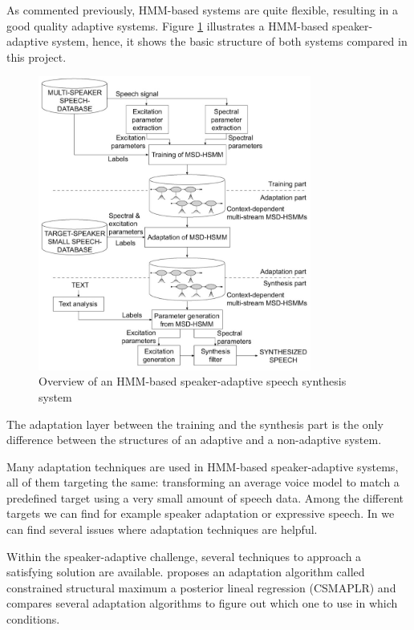 As commented previously, HMM-based systems are quite flexible, resulting in a good quality adaptive systems.
%
Figure \ref{fig:hmm_system_adapt_overview} illustrates a HMM-based speaker-adaptive system, hence, it shows the basic structure of both systems compared in this project.

\begin{figure}[!htb]
\begin{centering}
\includegraphics[width=0.8\textwidth]{images/hmm_based_system_adapt_overview.jpg}
\caption{Overview of an HMM-based speaker-adaptive speech synthesis system \cite{yamagishi2009}}
\label{fig:hmm_system_adapt_overview}
\end{centering}
\end{figure}

The adaptation layer between the training and the synthesis part is the only difference between the structures of an adaptive and a non-adaptive system.
%

Many adaptation techniques are used in HMM-based speaker-adaptive systems, all of them targeting the same: transforming an average voice model to match a predefined target using a very small amount of speech data.
%
Among the different targets we can find for example speaker adaptation or expressive speech.
%
In \cite{tokuda13} we can find several issues where adaptation techniques are helpful. 

Within the speaker-adaptive challenge, several techniques to approach a satisfying solution are available. 
%
\cite{yamagishi2009} proposes an adaptation algorithm called constrained structural maximum a posterior lineal regression (CSMAPLR) and compares several adaptation algorithms to figure out which one to use in which conditions.

